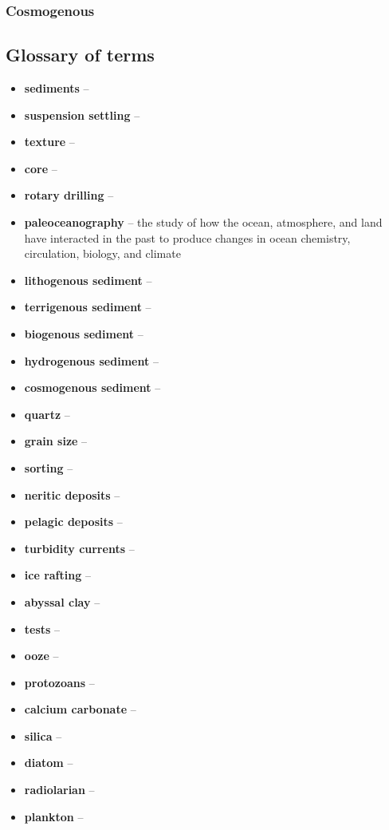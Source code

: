 \subsubsection{Cosmogenous}

\subsection{Glossary of terms}

\begin{itemize}
	\item \textbf{sediments} -- 
	\item \textbf{suspension settling} -- 
	\item \textbf{texture} -- 
	\item \textbf{core} -- 
	\item \textbf{rotary drilling} -- 
	\item \textbf{paleoceanography} -- the study of how the ocean,
		atmosphere, and land have interacted in the past to produce
		changes in ocean chemistry, circulation, biology, and climate
	\item \textbf{lithogenous sediment} -- 
	\item \textbf{terrigenous sediment} -- 
	\item \textbf{biogenous sediment} -- 
	\item \textbf{hydrogenous sediment} -- 
	\item \textbf{cosmogenous sediment} -- 
	\item \textbf{quartz} -- 
	\item \textbf{grain size} -- 
	\item \textbf{sorting} -- 
	\item \textbf{neritic deposits} -- 
	\item \textbf{pelagic deposits} -- 
	\item \textbf{turbidity currents} -- 
	\item \textbf{ice rafting} -- 
	\item \textbf{abyssal clay} -- 
	\item \textbf{tests} -- 
	\item \textbf{ooze} -- 
	\item \textbf{protozoans} -- 
	\item \textbf{calcium carbonate} -- 
	\item \textbf{silica} -- 
	\item \textbf{diatom} -- 
	\item \textbf{radiolarian} -- 
	\item \textbf{plankton} -- 

\end{itemize}
